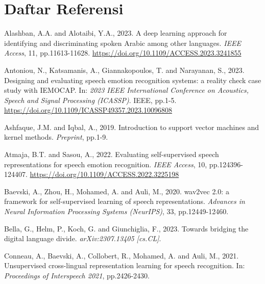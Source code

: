 
\chapter*{Daftar Referensi}

\begingroup
\setlength{\parindent}{-0.5cm}
\setlength{\leftskip}{0.5cm}
\setlength{\parskip}{6pt}

\noindent
Alashban, A.A. and Alotaibi, Y.A., 2023. A deep learning approach for
identifying and discriminating spoken Arabic among other languages.
\textit{IEEE Access}, 11, pp.11613-11628.
\url{https://doi.org/10.1109/ACCESS.2023.3241855}

\noindent
Antoniou, N., Katsamanis, A., Giannakopoulos, T. and Narayanan, S., 2023.
Designing and evaluating speech emotion recognition systems: a reality
check case study with IEMOCAP. In: \textit{2023 IEEE International
Conference on Acoustics, Speech and Signal Processing (ICASSP)}. IEEE,
pp.1-5. \url{https://doi.org/10.1109/ICASSP49357.2023.10096808}

\noindent
Ashfaque, J.M. and Iqbal, A., 2019. Introduction to support vector
machines and kernel methods. \emph{Preprint}, pp.1-9.

\noindent
Atmaja, B.T. and Sasou, A., 2022. Evaluating self-supervised speech
representations for speech emotion recognition. \textit{IEEE Access},
10, pp.124396-124407. \url{https://doi.org/10.1109/ACCESS.2022.3225198}

\noindent
Baevski, A., Zhou, H., Mohamed, A. and Auli, M., 2020. wav2vec 2.0: a
framework for self-supervised learning of speech representations.
\textit{Advances in Neural Information Processing Systems (NeurIPS)},
33, pp.12449-12460.

\noindent
Bella, G., Helm, P., Koch, G. and Giunchiglia, F., 2023. Towards
bridging the digital language divide. \textit{arXiv:2307.13405 [cs.CL]}.

\noindent
Conneau, A., Baevski, A., Collobert, R., Mohamed, A. and Auli, M., 2021.
Unsupervised cross-lingual representation learning for speech
recognition. In: \textit{Proceedings of Interspeech 2021}, pp.2426-2430.

